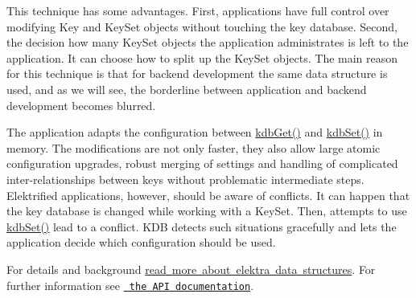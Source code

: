 This technique has some advantages. First, applications have full control over modifying {\ttfamily Key} and {\ttfamily Key\+Set} objects without touching the key database. Second, the decision how many {\ttfamily Key\+Set} objects the application administrates is left to the application. It can choose how to split up the {\ttfamily Key\+Set} objects. The main reason for this technique is that for backend development the same data structure is used, and as we will see, the borderline between application and backend development becomes blurred.

The application adapts the configuration between {\ttfamily \mbox{\hyperlink{group__kdb_ga28e385fd9cb7ccfe0b2f1ed2f62453a1}{kdb\+Get()}}} and {\ttfamily \mbox{\hyperlink{group__kdb_ga11436b058408f83d303ca5e996832bcf}{kdb\+Set()}}} in memory. The modifications are not only faster, they also allow large atomic configuration upgrades, robust merging of settings and handling of complicated inter-\/relationships between keys without problematic intermediate steps. Elektrified applications, however, should be aware of conflicts. It can happen that the key database is changed while working with a {\ttfamily Key\+Set}. Then, attempts to use {\ttfamily \mbox{\hyperlink{group__kdb_ga11436b058408f83d303ca5e996832bcf}{kdb\+Set()}}} lead to a conflict. {\ttfamily K\+DB} detects such situations gracefully and lets the application decide which configuration should be used.

For details and background \mbox{\hyperlink{doc_dev_data-structures_md}{read more about elektra data structures}}. For further information see \href{https://doc.libelektra.org/api/current/html/}{\texttt{ the A\+PI documentation}}. 
